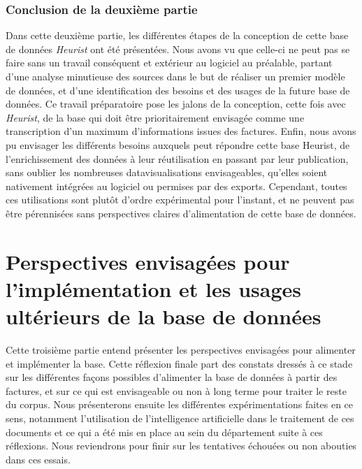 \documentclass[12pt,twoside]{book}
\begin{document}



\section{Conclusion de la deuxième partie}

Dans cette deuxième partie, les différentes étapes de la conception de cette base de données \emph{Heurist} ont été présentées. Nous avons vu que celle-ci ne peut pas se faire sans un travail conséquent et extérieur au logiciel au préalable, partant d'une analyse minutieuse des sources dans le but de réaliser un premier modèle de données, et d'une identification des besoins et des usages de la future base de données. Ce travail préparatoire pose les jalons de la conception, cette fois avec \emph{Heurist}, de la base qui doit être prioritairement envisagée comme une transcription d'un maximum d'informations issues des factures. Enfin, nous avons pu envisager les différents besoins auxquels peut répondre cette base Heurist, de l'enrichissement des données à leur réutilisation en passant par leur publication, sans oublier les nombreuses datavisualisations envisageables, qu'elles soient nativement intégrées au logiciel ou permises par des exports. Cependant, toutes ces utilisations sont plutôt d'ordre expérimental pour l'instant, et ne peuvent pas être pérennisées sans perspectives claires d'alimentation de cette base de données. 

    \part{Perspectives envisagées pour l'implémentation et les usages ultérieurs de la base de données}

Cette troisième partie entend présenter les perspectives envisagées pour alimenter et implémenter la base. Cette réflexion finale part des constats dressés à ce stade sur les différentes façons possibles d'alimenter la base de données à partir des factures, et sur ce qui est envisageable ou non à long terme pour traiter le reste du corpus. Nous présenterons ensuite les différentes expérimentations faites en ce sens, notamment l'utilisation de l'intelligence artificielle dans le traitement de ces documents et ce qui a été mis en place au sein du département suite à ces réflexions. Nous reviendrons pour finir sur les tentatives échouées ou non abouties dans ces essais. 




\end{document}

